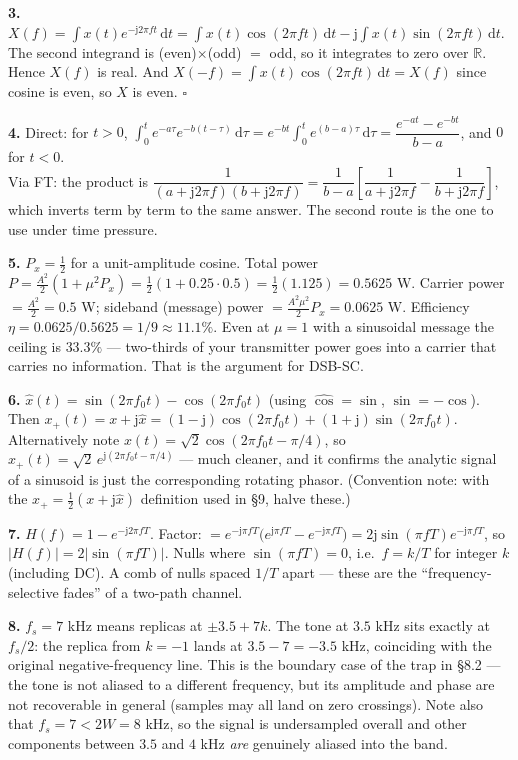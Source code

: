 \documentclass[11pt,a4paper]{article}
\newcommand{\dd}{\,\mathrm{d}}
\newcommand{\ii}{\mathrm{j}}
\begin{document}
\medskip
\textbf{3.} $X(f)=\int x(t)e^{-\ii2\pi ft}\dd t=\int x(t)\cos(2\pi ft)\dd t-\ii\int x(t)\sin(2\pi ft)\dd t$.
The second integrand is (even)$\times$(odd) $=$ odd, so it integrates to zero over $\mathbb{R}$. Hence $X(f)$
is real. And $X(-f)=\int x(t)\cos(2\pi ft)\dd t=X(f)$ since cosine is even, so $X$ is even. $\square$

\medskip
\textbf{4.} Direct: for $t>0$,
$\int_0^t e^{-a\tau}e^{-b(t-\tau)}\dd\tau=e^{-bt}\int_0^te^{(b-a)\tau}\dd\tau=\dfrac{e^{-at}-e^{-bt}}{b-a}$,
and $0$ for $t<0$.\\
Via FT: the product is $\dfrac{1}{(a+\ii2\pi f)(b+\ii2\pi f)}=\dfrac{1}{b-a}\left[\dfrac{1}{a+\ii2\pi f}-\dfrac{1}{b+\ii2\pi f}\right]$,
which inverts term by term to the same answer. The second route is the one to use under time pressure.

\medskip
\textbf{5.} $P_x=\frac12$ for a unit-amplitude cosine. Total power
$P=\frac{A^2}{2}(1+\mu^2P_x)=\frac12\left(1+0.25\cdot0.5\right)=\frac12(1.125)=0.5625$ W.
Carrier power $=\frac{A^2}{2}=0.5$ W; sideband (message) power $=\frac{A^2\mu^2}{2}P_x=0.0625$ W.
Efficiency $\eta=0.0625/0.5625=1/9\approx11.1\%$. Even at $\mu=1$ with a sinusoidal message the ceiling is
$33.3\%$ --- two-thirds of your transmitter power goes into a carrier that carries no information. That is the
argument for DSB-SC.

\medskip
\textbf{6.} $\hat x(t)=\sin(2\pi f_0t)-\cos(2\pi f_0t)$ (using $\hat{\cos}=\sin$, $\hat{\sin}=-\cos$).
Then $x_+(t)=x+\ii\hat x=(1-\ii)\cos(2\pi f_0t)+(1+\ii)\sin(2\pi f_0t)$. Alternatively note
$x(t)=\sqrt2\cos(2\pi f_0t-\pi/4)$, so $x_+(t)=\sqrt2\,e^{\ii(2\pi f_0t-\pi/4)}$ --- much cleaner, and it
confirms the analytic signal of a sinusoid is just the corresponding rotating phasor.
(Convention note: with the $x_+=\tfrac12(x+\ii\hat x)$ definition used in \S9, halve these.)

\medskip
\textbf{7.} $H(f)=1-e^{-\ii2\pi fT}$. Factor: $=e^{-\ii\pi fT}\big(e^{\ii\pi fT}-e^{-\ii\pi fT}\big)=2\ii\sin(\pi fT)e^{-\ii\pi fT}$,
so $|H(f)|=2|\sin(\pi fT)|$. Nulls where $\sin(\pi fT)=0$, i.e.\ $f=k/T$ for integer $k$ (including DC).
A comb of nulls spaced $1/T$ apart --- these are the ``frequency-selective fades'' of a two-path channel.

\medskip
\textbf{8.} $f_s=7$ kHz means replicas at $\pm3.5+7k$. The tone at $3.5$ kHz sits exactly at $f_s/2$: the
replica from $k=-1$ lands at $3.5-7=-3.5$ kHz, coinciding with the original negative-frequency line. This is
the boundary case of the trap in \S8.2 --- the tone is not aliased to a different frequency, but its amplitude
and phase are not recoverable in general (samples may all land on zero crossings). Note also that
$f_s=7<2W=8$ kHz, so the signal is undersampled overall and other components between $3.5$ and $4$ kHz
\emph{are} genuinely aliased into the band.
\end{document}
